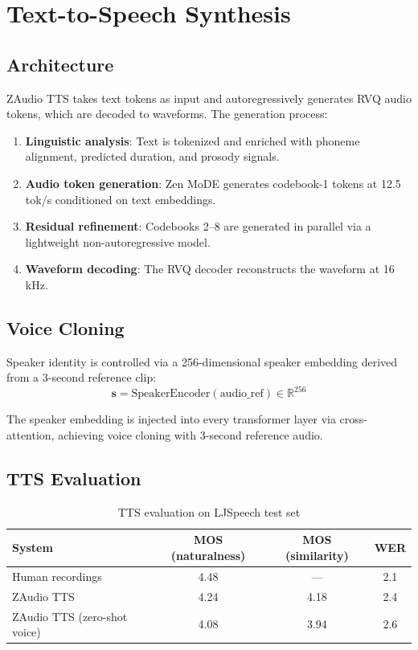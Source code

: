 \documentclass[11pt,a4paper]{article}
\begin{document}
\section{Text-to-Speech Synthesis}

\subsection{Architecture}

ZAudio TTS takes text tokens as input and autoregressively generates RVQ audio tokens, which are decoded to waveforms. The generation process:

\begin{enumerate}
  \item \textbf{Linguistic analysis}: Text is tokenized and enriched with phoneme alignment, predicted duration, and prosody signals.
  \item \textbf{Audio token generation}: Zen MoDE generates codebook-1 tokens at 12.5 tok/s conditioned on text embeddings.
  \item \textbf{Residual refinement}: Codebooks 2--8 are generated in parallel via a lightweight non-autoregressive model.
  \item \textbf{Waveform decoding}: The RVQ decoder reconstructs the waveform at 16 kHz.
\end{enumerate}

\subsection{Voice Cloning}

Speaker identity is controlled via a 256-dimensional speaker embedding derived from a 3-second reference clip:
\begin{equation}
\mathbf{s} = \text{SpeakerEncoder}(\text{audio\_ref}) \in \mathbb{R}^{256}
\end{equation}

The speaker embedding is injected into every transformer layer via cross-attention, achieving voice cloning with 3-second reference audio.

\subsection{TTS Evaluation}

\begin{table}[H]
\centering
\caption{TTS evaluation on LJSpeech test set}
\label{tab:tts}
\begin{tabular}{lccc}
\toprule
System & MOS (naturalness) & MOS (similarity) & WER \\
\midrule
Human recordings & 4.48 & — & 2.1 \\
ZAudio TTS & 4.24 & 4.18 & 2.4 \\
ZAudio TTS (zero-shot voice) & 4.08 & 3.94 & 2.6 \\
\bottomrule
\end{tabular}
\end{table}
\end{document}
